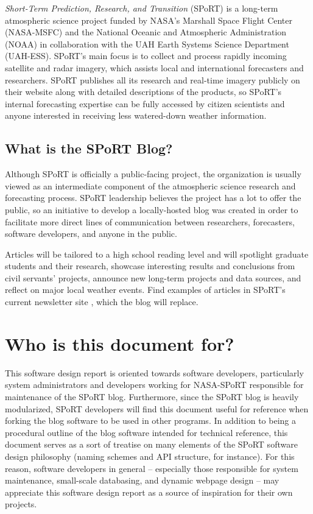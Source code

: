 \documentclass[12pt]{article}
\begin{document}
\textit{Short-Term Prediction, Research, and Transition} (SPoRT) is a long-term atmospheric science project funded by NASA's Marshall Space Flight Center (NASA-MSFC) and the National Oceanic and Atmospheric Administration (NOAA) in collaboration with the UAH Earth Systems Science Department (UAH-ESS). SPoRT's main focus is to collect and process rapidly incoming satellite and radar imagery, which assists local and international forecasters and researchers. SPoRT publishes all its research and real-time imagery publicly on their website \cite{SPoRT_RTD20} along with detailed descriptions of the products, so SPoRT's internal forecasting expertise can be fully accessed by citizen scientists and anyone interested in receiving less watered-down weather information.

\subsection{What is the SPoRT Blog?}

Although SPoRT is officially a public-facing project, the organization is usually viewed as an intermediate component of the atmospheric science research and forecasting process. SPoRT leadership believes the project has a lot to offer the public, so an initiative to develop a locally-hosted blog was created in order to facilitate more direct lines of communication between researchers, forecasters, software developers, and anyone in the public.

\newpage
Articles will be tailored to a high school reading level and will spotlight graduate students and their research, showcase interesting results and conclusions from civil servants' projects, announce new long-term projects and data sources, and reflect on major local weather events. Find examples of articles in SPoRT's current newsletter site \cite{sportnewsletter20}, which the blog will replace.

\section{Who is this document for?}

This software design report is oriented towards software developers, particularly system administrators and developers working for NASA-SPoRT responsible for maintenance of the SPoRT blog. Furthermore, since the SPoRT blog is heavily modularized, SPoRT developers will find this document useful for reference when forking the blog software to be used in other programs. In addition to being a procedural outline of the blog software intended for technical reference, this document serves as a sort of treatise on many elements of the SPoRT software design philosophy (naming schemes and API structure, for instance). For this reason, software developers in general -- especially those responsible for system maintenance, small-scale databasing, and dynamic webpage design -- may appreciate this software design report as a source of inspiration for their own projects.
\end{document}

